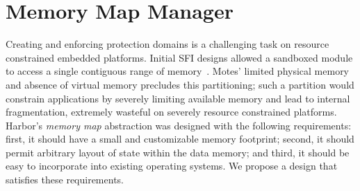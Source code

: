 \section{Memory Map Manager}
\label{sec:memmap}
%
Creating and enforcing protection domains is a challenging task on
resource constrained embedded platforms.
%
Initial SFI designs allowed a sandboxed module to access a single
contiguous range of memory~\cite{wahbe93sfi}.
%
Motes' limited physical memory and absence
of virtual memory precludes this partitioning; such a partition would
constrain applications by severely limiting available memory and lead
to internal fragmentation, extremely wasteful on severely resource
constrained platforms.
%
%
Harbor's \emph{memory map} abstraction was designed with the following
requirements:
%
first, it should have a small and customizable memory footprint;
%
second, it should permit arbitrary layout of state within the data memory;
%
and third, it should be easy to incorporate into existing
operating systems.
%
We propose a design that satisfies these requirements.
%
